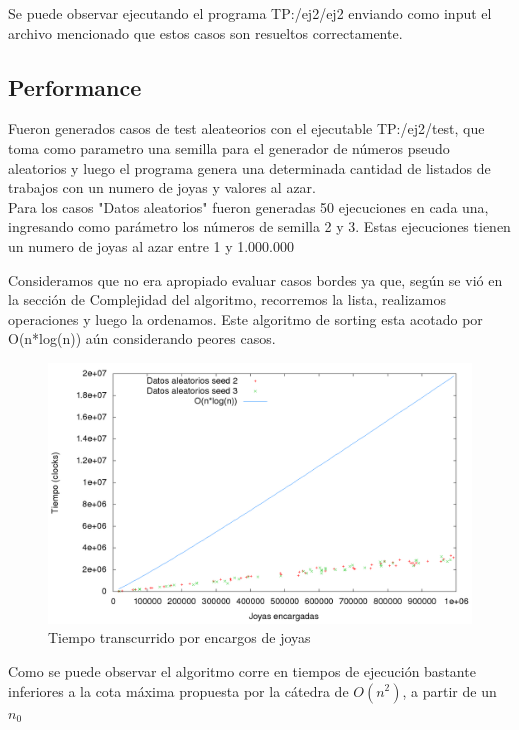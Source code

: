 Se puede observar ejecutando el programa TP:/ej2/ej2 enviando como input el archivo mencionado que estos casos son resueltos correctamente.

\subsection{Performance}

Fueron generados casos de test aleateorios con el ejecutable TP:/ej2/test, que toma como parametro una semilla para el generador de n\'umeros pseudo aleatorios y luego el programa genera una determinada cantidad de listados de trabajos con un numero de joyas y valores al azar.\\

Para los casos "Datos aleatorios" fueron generadas 50 ejecuciones en cada una, ingresando como par\'ametro los n\'umeros de semilla 2 y 3. Estas ejecuciones tienen un numero de joyas al azar entre 1 y 1.000.000

Consideramos que no era apropiado evaluar casos bordes ya que, seg\'un se vi\'o en la secci\'on de Complejidad del algoritmo, recorremos la lista, realizamos operaciones y luego la ordenamos. Este algoritmo de sorting esta acotado por O(n*log(n)) a\'un considerando peores casos.

\begin{center}
\begin{figure}[h!]
\includegraphics[scale=0.4]{./img/ej2_chart2.png}
\caption{Tiempo transcurrido por encargos de joyas}
\end{figure}
\end{center}

Como se puede observar el algoritmo corre en tiempos de ejecuci\'on bastante inferiores a la cota m\'axima propuesta por la c\'atedra de $O(n^2)$, a partir de un $n_{0}$
